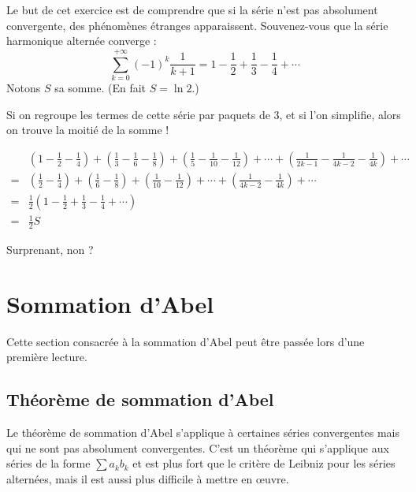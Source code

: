 \documentclass[class=report,crop=false]{standalone}
\begin{document}
\begin{miniexercices}
Le but de cet exercice est de comprendre que si la série n'est pas absolument convergente,
des phénomènes étranges apparaissent.
Souvenez-vous que la série harmonique alternée converge :
$$\sum_{k=0}^{+\infty} (-1)^{k} \frac{1}{k+1} 
= 1-\frac{1}{2}+\frac{1}{3}-\frac{1}{4} +\cdots $$
Notons $S$ sa somme. (En fait $S = \ln 2$.)

Si on regroupe les termes de cette série par paquets de $3$, et si l'on simplifie, alors
on trouve la moitié de la somme !


\begin{align*}
& \left(1-\frac{1}{2}-\frac{1}{4} \right)+
  \left(\frac{1}{3}-\frac{1}{6}-\frac{1}{8} \right)+
  \left(\frac{1}{5}-\frac{1}{10}-\frac{1}{12} \right)+\cdots+ 
  \left(\frac{1}{2k-1}-\frac{1}{4k-2}-\frac{1}{4k} \right)+\cdots   \\
= &  \left(\frac{1}{2}-\frac{1}{4} \right)+
  \left(\frac{1}{6}-\frac{1}{8} \right)+
  \left(\frac{1}{10}-\frac{1}{12} \right)+\cdots+ 
  \left(\frac{1}{4k-2}-\frac{1}{4k} \right)+\cdots   \\ 
= & \frac12  \left( 1-\frac{1}{2}+\frac{1}{3}-\frac{1}{4} + \cdots \right) \\
= & \frac12 S
\end{align*}

Surprenant, non ?

\end{miniexercices}


\section{Sommation d'Abel}

Cette section consacrée à la sommation d'Abel
peut être passée lors d'une première lecture.

\subsection{Théorème de sommation d'Abel}


Le théorème de sommation d'Abel s'applique à certaines séries
convergentes mais qui ne sont pas absolument convergentes.
C'est un théorème qui s'applique aux séries de la forme $\sum a_kb_k$
et est plus fort que le critère de Leibniz pour les séries alternées,
mais il est aussi plus difficile à mettre en \oe uvre.
\end{document}

